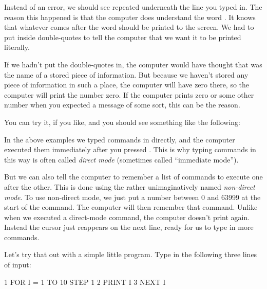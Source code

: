   Instead of an error, we should see  repeated underneath
  the line you typed in.  The reason this happened is that the computer
  does understand the word .  It knows that whatever comes after
  the word  should be printed to the screen.  We had to put  inside double-quotes to tell the computer that we want it to be
  printed literally.

  If we hadn't put the double-quotes in, the computer would have thought
  that  was the name of a stored piece of information.
  But because we haven't stored any piece of information in such a place,
  the computer will have zero there, so the computer will print the number
  zero. If the computer prints zero or some other number when
  you expected a message of some sort, this can be the reason.

\needspace{4cm} %
  You can try it, if you like, and you should see something like the following:


  In the above examples we typed commands in directly, and the computer executed
  them immediately after you pressed .  This is why
  typing commands in this way is often called {\em direct mode} (sometimes called ``immediate mode'').

  But we can also tell the computer to remember a list of commands to execute one
  after the other.   This is done using the rather unimaginatively named {\em non-direct mode}.
  To use non-direct mode, we just put a number between 0 and 63999 at the start of
  the command.  The computer will then remember that command.  Unlike when we executed
  a direct-mode command, the computer doesn't print  again. Instead the cursor
  just reappears on the next line, ready for us to type in more commands.

\needspace{4cm} %
  Let's try that out with a simple little program.  Type in the following three lines of
  input:

\begin{screencode}
1 FOR I = 1 TO 10 STEP 1
2 PRINT I
3 NEXT I
\end{screencode}

